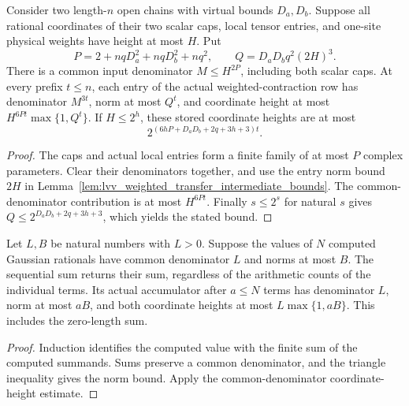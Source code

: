 \begin{lemma}
    \label{lem:lvv_weighted_transfer_prefix_bits}
    \leanok
    Consider two length-$n$ open chains with virtual bounds $D_a,D_b$.
    Suppose all rational coordinates of their two scalar caps, local
    tensor entries, and one-site physical weights have height at most $H$.
    Put
    \[
        P=2+nqD_a^2+nqD_b^2+nq^2,\qquad
        Q=D_aD_bq^2(2H)^3.
    \]
    There is a common input denominator $M\le H^{2P}$, including both
    scalar caps. At every prefix $t\le n$, each entry of the actual
    weighted-contraction row has denominator $M^{3t}$, norm at most
    $Q^t$, and coordinate height at most $H^{6Pt}\max\{1,Q^t\}$.
    If $H\le2^h$, these stored coordinate heights are at most
    \[
        2^{(6hP+D_aD_b+2q+3h+3)t}.
    \]
\end{lemma}
\begin{proof}\leanok
    The caps and actual local entries form a finite family of at most
    $P$ complex parameters. Clear their denominators together, and
    use the entry norm bound $2H$ in
    Lemma~\ref{lem:lvv_weighted_transfer_intermediate_bounds}.
    The common-denominator contribution is at most $H^{6Pt}$.
    Finally $s\le2^s$ for natural $s$ gives
    $Q\le2^{D_aD_b+2q+3h+3}$, which yields the stated bound.
\end{proof}

\begin{lemma}
    \label{lem:lvv_rational_accumulation_bounds}
    \leanok
    Let $L,B$ be natural numbers with $L>0$. Suppose the values of
    $N$ computed Gaussian rationals have common denominator $L$ and
    norms at most $B$. The sequential sum returns their sum, regardless
    of the arithmetic counts of the individual terms. Its actual
    accumulator after $a\le N$ terms has denominator $L$, norm at most
    $aB$, and both coordinate heights at most $L\max\{1,aB\}$.
    This includes the zero-length sum.
\end{lemma}
\begin{proof}\leanok
    Induction identifies the computed value with the finite sum of the
    computed summands. Sums preserve a common denominator, and the
    triangle inequality gives the norm bound. Apply the
    common-denominator coordinate-height estimate.
\end{proof}

